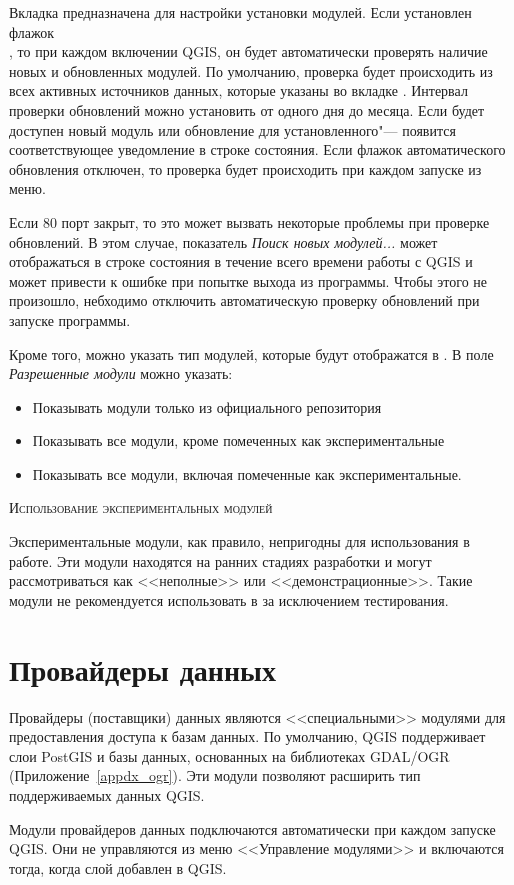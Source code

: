 
Вкладка  предназначена для настройки установки модулей.
Если установлен флажок \\
, то
при каждом включении QGIS, он будет автоматически проверять наличие
новых и обновленных модулей. По умолчанию, проверка будет происходить
из всех активных источников данных, которые указаны во вкладке
. Интервал проверки обновлений можно установить от
одного дня до месяца. Если будет доступен новый модуль или обновление
для установленного"--- появится соответствующее уведомление в строке
состояния. Если флажок автоматического обновления отключен, то проверка
будет происходить при каждом запуске  из
меню.

Если 80 порт закрыт, то это может вызвать некоторые проблемы при
проверке обновлений. В этом случае, показатель
\textit{Поиск новых модулей...} может отображаться в строке состояния
в течение всего времени работы с QGIS и может привести к ошибке при
попытке выхода из программы. Чтобы этого не произошло, небходимо
отключить автоматическую проверку обновлений при запуске программы.

Кроме того, можно указать тип модулей, которые будут отображатся в
. В поле \textit{Разрешенные модули} можно
указать:

\begin{itemize}[label=--]
\item Показывать модули только из официального репозитория
\item Показывать все модули, кроме помеченных как экспериментальные
\item Показывать все модули, включая помеченные как экспериментальные.
\end{itemize}

\begin{Tip}
 \caption{\textsc{Использование экспериментальных модулей}}
Экспериментальные модули, как правило, непригодны для использования в
работе. Эти модули находятся на ранних стадиях разработки и могут
рассмотриваться как <<неполные>> или <<демонстрационные>>. Такие модули
не рекомендуется использовать в за исключением тестирования.
\end{Tip}

\section{Провайдеры данных}

Провайдеры (поставщики) данных являются <<специальными>> модулями для
предоставления доступа к базам данных. По умолчанию, QGIS поддерживает
слои PostGIS и базы данных, основанных на библиотеках GDAL/OGR
(Приложение~\ref{appdx_ogr}). Эти модули позволяют расширить тип
поддерживаемых данных QGIS.

Модули провайдеров данных подключаются автоматически при каждом запуске
QGIS. Они не управляются из меню <<Управление модулями>> и включаются
тогда, когда слой добавлен в QGIS.

\FloatBarrier
